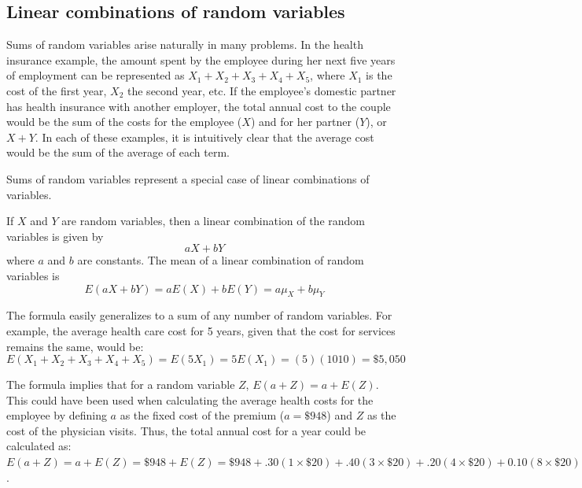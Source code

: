 
\subsection{Linear combinations of random variables}

Sums of random variables arise naturally in many problems. In the health insurance example, the amount spent by the employee during her next five years of employment can be represented as $X_1 + X_2 + X_3 + X_4 + X_5$, where $X_1$ is the cost of the first year, $X_2$ the second year, etc. If the employee's domestic partner has health insurance with another employer, the total annual cost to the couple would be the sum of the costs for the employee ($X$) and for her partner ($Y$), or $X + Y$. In each of these examples, it is intuitively clear that the average cost would be the sum of the average of each term.

Sums of random variables represent a special case of linear combinations of variables.  

\begin{termBox}{
		If $X$ and $Y$ are random variables, then a linear combination of the random variables is given by
		\[aX + bY\] \label{linComboOfRandomVariablesXAndY}
		where $a$ and $b$ are constants.  The mean of a linear combination of random variables is 
		\[E(aX + bY) = aE(X) + bE(Y) = a\mu_X + b\mu_Y\] }
\end{termBox}

The formula easily generalizes to a sum of any number of random variables. For example, the average health care cost for 5 years, given that the cost for services remains the same, would be: 
\[E(X_1 + X_2 + X_3 + X_4 + X_5) = E(5 X_1) = 5E(X_1) =(5)(1010) = \$5,050\]

The formula implies that for a random variable $Z$, $E(a + Z) = a + E(Z)$.  This could have been used when calculating the average health costs for the employee by defining $a$ as the fixed cost of the premium ($a=\$948$) and $Z$ as the cost of the physician visits. Thus, the total annual cost for a year could be calculated as: $E(a + Z) = a + E(Z) = \$948 + E(Z) = \$948 + .30(1 \times \$20) + .40(3 \times \$20) + .20(4 \times \$20) + 0.10(8 \times \$20)= \$1,010.00$. 

